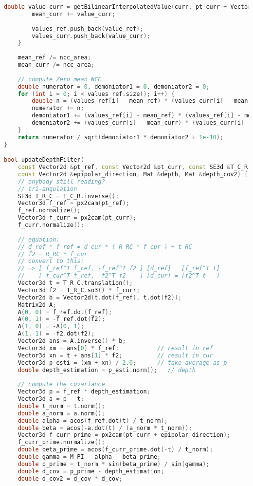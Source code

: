 \begin{lstlisting}[language=c++,caption=slambook2/ch12/dense\_monocular/dense\_mapping.cpp (part)]
		double value_curr = getBilinearInterpolatedValue(curr, pt_curr + Vector2d(x, y));
		mean_curr += value_curr;
		
		values_ref.push_back(value_ref);
		values_curr.push_back(value_curr);
	}
	
	mean_ref /= ncc_area;
	mean_curr /= ncc_area;
	
	// compute Zero mean NCC
	double numerator = 0, demoniator1 = 0, demoniator2 = 0;
	for (int i = 0; i < values_ref.size(); i++) {
		double n = (values_ref[i] - mean_ref) * (values_curr[i] - mean_curr);
		numerator += n;
		demoniator1 += (values_ref[i] - mean_ref) * (values_ref[i] - mean_ref);
		demoniator2 += (values_curr[i] - mean_curr) * (values_curr[i] - mean_curr);
	}
	return numerator / sqrt(demoniator1 * demoniator2 + 1e-10);  
}

bool updateDepthFilter(
	const Vector2d &pt_ref, const Vector2d &pt_curr, const SE3d &T_C_R,
	const Vector2d &epipolar_direction, Mat &depth, Mat &depth_cov2) {
	// anybody still reading?
	// tri-angulation
	SE3d T_R_C = T_C_R.inverse();
	Vector3d f_ref = px2cam(pt_ref);
	f_ref.normalize();
	Vector3d f_curr = px2cam(pt_curr);
	f_curr.normalize();
	
	// equation:
	// d_ref * f_ref = d_cur * ( R_RC * f_cur ) + t_RC
	// f2 = R_RC * f_cur
	// convert to this:
	// => [ f_ref^T f_ref, -f_ref^T f2 ] [d_ref]   [f_ref^T t]
	//    [ f_cur^T f_ref, -f2^T f2    ] [d_cur] = [f2^T t   ]
	Vector3d t = T_R_C.translation();
	Vector3d f2 = T_R_C.so3() * f_curr;
	Vector2d b = Vector2d(t.dot(f_ref), t.dot(f2));
	Matrix2d A;
	A(0, 0) = f_ref.dot(f_ref);
	A(0, 1) = -f_ref.dot(f2);
	A(1, 0) = -A(0, 1);
	A(1, 1) = -f2.dot(f2);
	Vector2d ans = A.inverse() * b;
	Vector3d xm = ans[0] * f_ref;           // result in ref
	Vector3d xn = t + ans[1] * f2;          // result in cur 
	Vector3d p_esti = (xm + xn) / 2.0;      // take average as p
	double depth_estimation = p_esti.norm();   // depth
	
	// compute the covariance
	Vector3d p = f_ref * depth_estimation;
	Vector3d a = p - t;
	double t_norm = t.norm();
	double a_norm = a.norm();
	double alpha = acos(f_ref.dot(t) / t_norm);
	double beta = acos(-a.dot(t) / (a_norm * t_norm));
	Vector3d f_curr_prime = px2cam(pt_curr + epipolar_direction);
	f_curr_prime.normalize();
	double beta_prime = acos(f_curr_prime.dot(-t) / t_norm);
	double gamma = M_PI - alpha - beta_prime;
	double p_prime = t_norm * sin(beta_prime) / sin(gamma);
	double d_cov = p_prime - depth_estimation;
	double d_cov2 = d_cov * d_cov;
	

\end{lstlisting}
